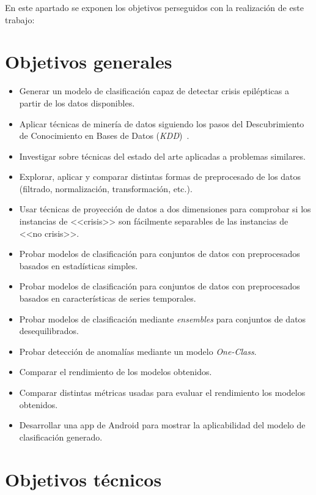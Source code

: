 
En este apartado se exponen los objetivos perseguidos con la realización de este trabajo: 

\section{Objetivos generales}

\begin{itemize}
	\item Generar un modelo de clasificación capaz de detectar crisis epilépticas a partir de los datos disponibles. 
	\item Aplicar técnicas de minería de datos siguiendo los pasos del Descubrimiento de Conocimiento en Bases de Datos (\textit{KDD})~\cite{fayyad1996data}.
	\item Investigar sobre técnicas del estado del arte aplicadas a problemas similares. 
	\item Explorar, aplicar y comparar distintas formas de preprocesado de los datos (filtrado, normalización, transformación, etc.). 
	\item Usar técnicas de proyección de datos a dos dimensiones para comprobar si los instancias de <<crisis>> son fácilmente separables de las instancias de <<no crisis>>. 
	\item Probar modelos de clasificación para conjuntos de datos con preprocesados basados en estadísticas simples.
	\item Probar modelos de clasificación para conjuntos de datos con preprocesados basados en características de series temporales.  
	\item Probar modelos de clasificación mediante \textit{ensembles} para conjuntos de datos desequilibrados. 
	\item Probar detección de anomalías mediante un modelo \textit{One-Class}.
	\item Comparar el rendimiento de los modelos obtenidos. 
	\item Comparar distintas métricas usadas para evaluar el rendimiento los modelos obtenidos. 
	\item Desarrollar una app de Android para mostrar la aplicabilidad del modelo de clasificación generado. 
\end{itemize}

\section{Objetivos técnicos}

